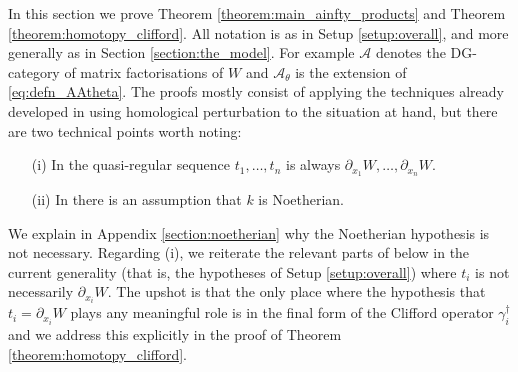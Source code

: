 \documentclass[english,letter paper,12pt,leqno]{article}
\theoremstyle{example}
\numberwithin{equation}{section}
\def\AA{\mathcal{A}}
\begin{document}
In this section we prove Theorem \ref{theorem:main_ainfty_products} and Theorem \ref{theorem:homotopy_clifford}. All notation is as in Setup \ref{setup:overall}, and more generally as in Section \ref{section:the_model}. For example $\AA$ denotes the DG-category of matrix factorisations of $W$ and $\AA_{\theta}$ is the extension of \eqref{eq:defn_AAtheta}. The proofs mostly consist of applying the techniques already developed in \cite{pushforward, cut} using homological perturbation to the situation at hand, but there are two technical points worth noting:
\begin{itemize}
\item[(i)] In \cite{cut} the quasi-regular sequence $t_1,\ldots,t_n$ is always $\partial_{x_1} W, \ldots, \partial_{x_n} W$.
\item[(ii)] In \cite{cut} there is an assumption that $k$ is Noetherian.
\end{itemize}
We explain in Appendix \ref{section:noetherian} why the Noetherian hypothesis is not necessary. Regarding (i), we reiterate the relevant parts of \cite{cut} below in the current generality (that is, the hypotheses of Setup \ref{setup:overall}) where $t_i$ is not necessarily $\partial_{x_i} W$. The upshot is that the only place where the hypothesis that $t_i = \partial_{x_i} W$ plays any meaningful role is in the final form of the Clifford operator $\gamma_i^\dagger$ and we address this explicitly in the proof of Theorem \ref{theorem:homotopy_clifford}.
\end{document}
